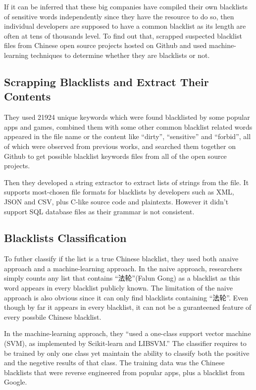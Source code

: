 \documentclass[11pt]{article} %
\begin{document}
If it can be inferred that these big companies have compiled their own blacklists of sensitive words independently since they have the resource to do so, then individual developers are supposed to have a common blacklist as its length are often at tens of thousands level. To find out that, \cite{knockel2018effect} scrapped suspected blacklist files from Chinese open source projects hosted on Github and used machine-learning techniques to determine whether they are blacklists or not.

\subsection{Scrapping Blacklists and Extract Their Contents}

They used 21924 unique keywords which were found blacklisted by some popular apps and games, combined them with some other common blacklist related words appeared in the file name or the content like ``dirty'', ``sensitive'' and ``forbid'', all of which were observed from previous works, and searched them together on Github to get possible blacklist keywords files from all of the open source projects.

Then they developed a string extractor to extract lists of strings from the file. It supports most-chosen file formats for blacklists by developers such as XML, JSON and CSV, plus C-like source code and plaintexts. However it didn't support SQL database files as their grammar is not consistent.

\subsection{Blacklists Classification}

To futher classify if the list is a true Chinese blacklist, they used both anaive approach and a machine-learning approach. In the naive approach, researchers simply counts any list that contains ``法轮''(Falun Gong) as a blacklist as this word appears in every blacklist publicly known. The limitation of the naive approach is also obvious since it can only find blacklists containing ``法轮''. Even though by far it appears in every blacklist, it can not be a guranteened feature of every possbile Chinese blacklist.

In the machine-learning approach, they ``used a one-class support vector machine (SVM)\cite{scholkopf2001estimating}, as implemented by Scikit-learn\cite{pedregosa2011scikit} and LIBSVM\cite{chang2011libsvm}.''\cite{knockel2018effect} The classifier requires to be trained by only one class yet maintain the ability to classify both the positive and the negetive results of that class. The training data was the Chinese blacklists that were reverse engineered from popular apps, plus a blacklist from Google\cite{BibEntry2012Jun}.
\end{document}

